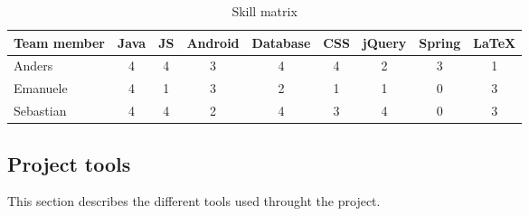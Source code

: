 \begin{table}[h]
\begin{center}
\begin{tabular}{ | l | c | c | c | c | c | c | c | c | }
  \hline
  Team member & Java & JS & Android & Database & CSS & jQuery & Spring & LaTeX \\
  \hline\noalign{\smallskip}\noalign{\smallskip}\hline
  Anders & 4 & 4 & 3 & 4 & 4 & 2 & 3 & 1 \\
  Emanuele & 4 & 1 & 3 & 2 & 1 & 1 & 0 & 3 \\
  Sebastian & 4 & 4 & 2 & 4 & 3 & 4 & 0 & 3 \\
  \hline
\end{tabular}
\end{center}
\caption{Skill matrix}
\label{table:skillmatrix}
\end{table}



\subsection{Project tools}
This section describes the different tools used throught the project.

